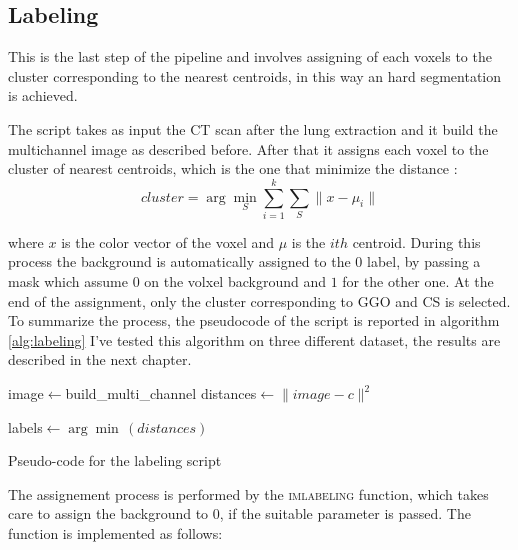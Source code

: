 
	
	\subsection{Labeling}
	
	
	
	
	This is the last step of the pipeline and involves assigning of  each voxels to the cluster corresponding to the nearest centroids, in this way an hard segmentation is achieved.
	
	The script takes as input the CT scan after the lung extraction and it build the multichannel image as described before. After that it assigns each voxel to the cluster of nearest centroids, which is the one that minimize the distance : 
	\begin{equation}
		cluster = \arg\min_{S}  \sum_{i=1}^k \sum_{S} \| x - \mu_i\|
	\end{equation}
	
	where $x$ is the color vector of the voxel and $\mu$ is the $ith$ centroid. During this process the background is automatically assigned to the 0 label, by passing a mask which assume $0$ on the volxel background and $1$ for the other one. At the end of the assignment, only the cluster corresponding to GGO and CS is selected.
	To summarize the process, the pseudocode of the script is reported in algorithm\,\ref{alg:labeling}
	I've tested this algorithm on three different dataset, the results are described in the next chapter.
	
	\begin{algorithm}
		
		\SetAlgoLined
		\DontPrintSemicolon
		
		
		
		image$\leftarrow$build\_multi\_channel\;
		{
			distances$\leftarrow\| image - c\|^2$\;
		}
		
		labels$\leftarrow\arg\min\,(distances)$\;
		
		\caption{Pseudo-code for the labeling script}\label{alg:labeling}
		
	\end{algorithm}
	

	The assignement process is performed by the \textsc{imlabeling} function, which takes care to assign the background to $0$, if the suitable parameter is passed.  The function is implemented as follows:
		
